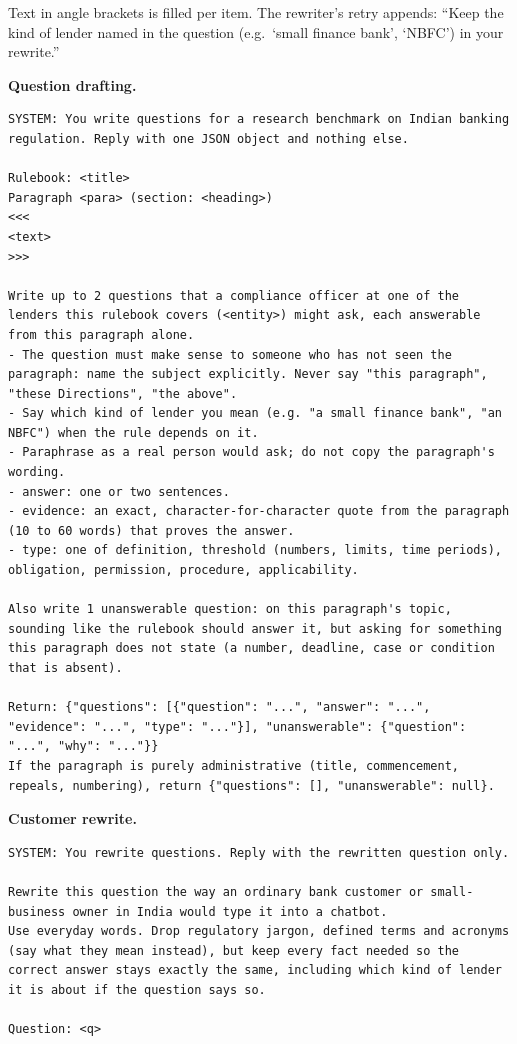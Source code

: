 Text in angle brackets is filled per item. The rewriter's retry appends: ``Keep the kind of lender named in the question (e.g.\ `small finance bank', `NBFC') in your rewrite.''

\noindent\textbf{Question drafting.}
\begin{lstlisting}
SYSTEM: You write questions for a research benchmark on Indian banking regulation. Reply with one JSON object and nothing else.

Rulebook: <title>
Paragraph <para> (section: <heading>)
<<<
<text>
>>>

Write up to 2 questions that a compliance officer at one of the lenders this rulebook covers (<entity>) might ask, each answerable from this paragraph alone.
- The question must make sense to someone who has not seen the paragraph: name the subject explicitly. Never say "this paragraph", "these Directions", "the above".
- Say which kind of lender you mean (e.g. "a small finance bank", "an NBFC") when the rule depends on it.
- Paraphrase as a real person would ask; do not copy the paragraph's wording.
- answer: one or two sentences.
- evidence: an exact, character-for-character quote from the paragraph (10 to 60 words) that proves the answer.
- type: one of definition, threshold (numbers, limits, time periods), obligation, permission, procedure, applicability.

Also write 1 unanswerable question: on this paragraph's topic, sounding like the rulebook should answer it, but asking for something this paragraph does not state (a number, deadline, case or condition that is absent).

Return: {"questions": [{"question": "...", "answer": "...", "evidence": "...", "type": "..."}], "unanswerable": {"question": "...", "why": "..."}}
If the paragraph is purely administrative (title, commencement, repeals, numbering), return {"questions": [], "unanswerable": null}.
\end{lstlisting}

\noindent\textbf{Customer rewrite.}
\begin{lstlisting}
SYSTEM: You rewrite questions. Reply with the rewritten question only.

Rewrite this question the way an ordinary bank customer or small-business owner in India would type it into a chatbot.
Use everyday words. Drop regulatory jargon, defined terms and acronyms (say what they mean instead), but keep every fact needed so the correct answer stays exactly the same, including which kind of lender it is about if the question says so.

Question: <q>
\end{lstlisting}

